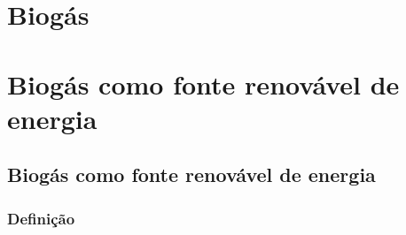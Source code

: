 \part{Biogás}

\part{Biogás como fonte renovável de energia}
\chapter[Biogás como fonte renovável de energia]{Biogás como fonte renovável de energia}
\section {Definição}

